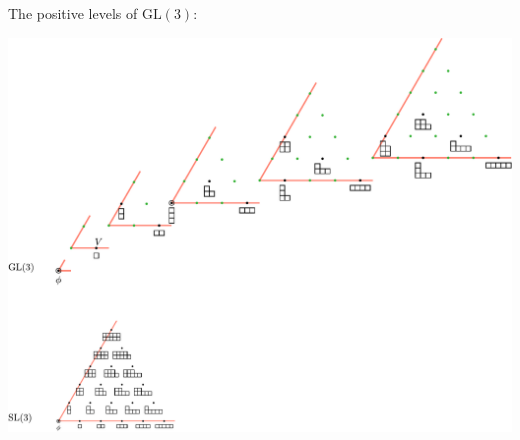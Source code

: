 \documentclass[11pt,oneside]{article}
\newcommand{\GL}{\mathrm{GL}}
\begin{document}
The positive levels of $\GL(3)$:
\begin{center}
\includegraphics[scale=0.6]{images/gl3.pdf}
\end{center}

%
\end{document}

